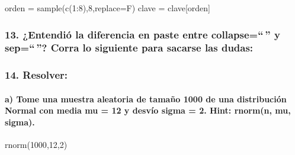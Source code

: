 \documentclass[
]{article}
\newenvironment{Shaded}{\begin{snugshade}}{\end{snugshade}}
\newcommand{\AttributeTok}[1]{\textcolor[rgb]{0.77,0.63,0.00}{#1}}
\newcommand{\DecValTok}[1]{\textcolor[rgb]{0.00,0.00,0.81}{#1}}
\newcommand{\FunctionTok}[1]{\textcolor[rgb]{0.00,0.00,0.00}{#1}}
\newcommand{\NormalTok}[1]{#1}
\newcommand{\OtherTok}[1]{\textcolor[rgb]{0.56,0.35,0.01}{#1}}
\newcommand{\SpecialCharTok}[1]{\textcolor[rgb]{0.00,0.00,0.00}{#1}}
\begin{document}
\begin{Shaded}
\begin{Highlighting}[]
\NormalTok{orden }\OtherTok{=} \FunctionTok{sample}\NormalTok{(}\FunctionTok{c}\NormalTok{(}\DecValTok{1}\SpecialCharTok{:}\DecValTok{8}\NormalTok{),}\DecValTok{8}\NormalTok{,}\AttributeTok{replace=}\NormalTok{F)}
\NormalTok{clave }\OtherTok{=}\NormalTok{ clave[orden]}
\end{Highlighting}
\end{Shaded}

\hypertarget{entendiuxf3-la-diferencia-en-paste-entre-collapse-y-sep-corra-lo-siguiente-para-sacarse-las-dudas}{%
\subsubsection{13. ¿Entendió la diferencia en paste entre
collapse=``\,'' y sep=``\,''? Corra lo siguiente para sacarse las
dudas:}\label{entendiuxf3-la-diferencia-en-paste-entre-collapse-y-sep-corra-lo-siguiente-para-sacarse-las-dudas}}

\hypertarget{resolver-3}{%
\subsubsection{14. Resolver:}\label{resolver-3}}

\hypertarget{a-tome-una-muestra-aleatoria-de-tamauxf1o-1000-de-una-distribuciuxf3n-normal-con-media-mu-12-y-desvuxedo-sigma-2.-hint-rnormn-mu-sigma.}{%
\paragraph{a) Tome una muestra aleatoria de tamaño 1000 de una
distribución Normal con media mu = 12 y desvío sigma = 2. Hint: rnorm(n,
mu,
sigma).}\label{a-tome-una-muestra-aleatoria-de-tamauxf1o-1000-de-una-distribuciuxf3n-normal-con-media-mu-12-y-desvuxedo-sigma-2.-hint-rnormn-mu-sigma.}}

\begin{Shaded}
\begin{Highlighting}[]
\FunctionTok{rnorm}\NormalTok{(}\DecValTok{1000}\NormalTok{,}\DecValTok{12}\NormalTok{,}\DecValTok{2}\NormalTok{)}
\end{Highlighting}
\end{Shaded}
\end{document}
